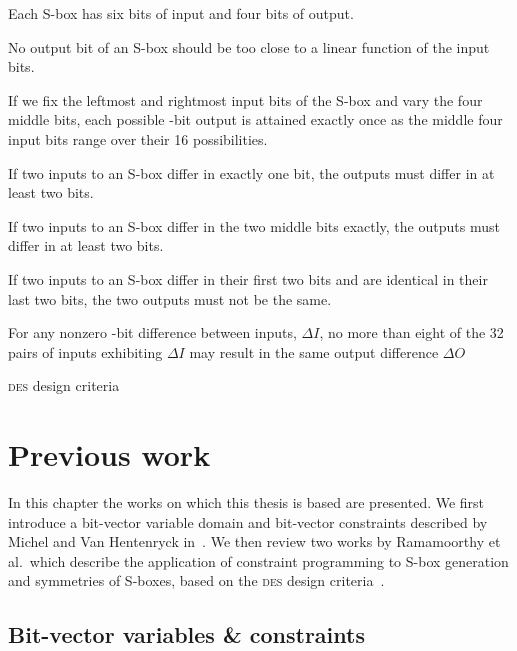 \documentclass[a4paper,10pt,twoside,openright]{book}
\renewcommand{\sc}[1]{\textsc{\lowercase{#1}}}
\renewcommand{\ln}[1]{{\fontsize{8pt}{8pt}\selectfont#1}}
\begin{document}
\begin{table}
\begin{SL}
    \item Each S-box has six bits of input and four bits of output. \\
    \item No output bit of an S-box should be too close to a linear function of the input bits. \\
    \item If we fix the leftmost and rightmost input bits of the S-box and vary the four middle bits, each possible \ln{4}-bit output is attained exactly once as the middle four input bits range over their 16 possibilities. \\
    \item If two inputs to an S-box differ in exactly one bit, the outputs must differ in at least two bits. \\
    \item If two inputs to an S-box differ in the two middle bits exactly, the outputs must differ in at least two bits. \\
    \item If two inputs to an S-box differ in their first two bits and are identical in their last two bits, the two outputs must not be the same. \\
    \item For any nonzero \ln{6}-bit difference between inputs, $\Delta I$, no more than eight of the 32 pairs of inputs exhibiting $\Delta I$ may result in the same output difference $\Delta O$ \\
\end{SL}
\caption{\sc{DES} design criteria}
\label{tab:descriteria}
\end{table}

\chapter{Previous work}
\label{sec:previous}
In this chapter the works on which this thesis is based are presented. 
We first introduce a bit-vector variable domain 
and bit-vector constraints described by 
Michel and Van Hentenryck in~\cite{bitvectors}.
We then review 
two works by Ramamoorthy et al.\ which 
describe the application of constraint programming
to S-box generation
and symmetries of S-boxes,
based on the \sc{DES} design criteria~\cite{sboxes}\cite{sboxsymmetry}.

\section{Bit-vector variables \& constraints}
\label{sec:bitvectors}
\end{document}
